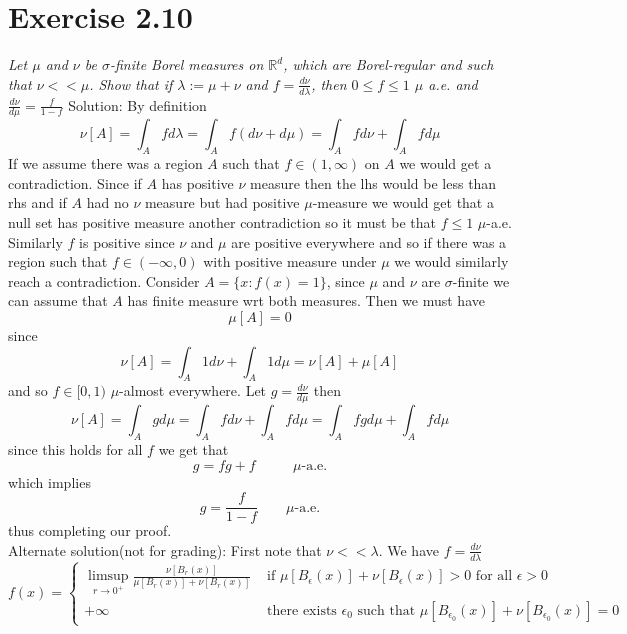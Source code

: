 \documentclass[11pt]{article}
\newcommand{\solution}[1]{{{\textcolor{header}{Solution:} \textcolor{solution}{#1}}}}
\begin{document}
\section{Exercise 2.10}
\emph{
    Let $\mu$ and $\nu$ be  $\sigma$-finite Borel measures on $ \mathbb{R}^{d}$, which are Borel-regular and such that $\nu << \mu$. Show that
    if $\lambda := \mu + \nu$ and $f = \frac{d\nu}{d \lambda}$, then $0 \le f \le 1$  $\mu$ a.e. and $\frac{d \nu}{d  \mu} = \frac{f}{1-f}$
}
\solution{
    By definition
    \[
        \nu[A] = \int_{A}^{}f d \lambda = \int_{A}^{}f(d \nu + d \mu) = \int_{A}^{}f d \nu + \int_{A}^{}f d \mu
    \] 
    If we assume there was a region $A$ such that  $f \in (1,\infty)$ on $A$ we would get a contradiction.
    Since if $A$ has positive  $\nu$ measure then the lhs would be less than rhs and if  $A$ had no  $\nu$ measure but had positive  $\mu$-measure we would 
    get that a null set has positive measure another contradiction so it must be that $f \le 1$  $\mu$-a.e.
    Similarly  $f$ is positive since $\nu$ and  $\mu$ are positive everywhere and so if there was a region
    such that  $f \in (-\infty,0)$ with positive measure under $\mu$ we would similarly reach a contradiction.
    Consider $A = \{x : f(x) = 1\}$, since $\mu$ and $\nu$ are  $\sigma$-finite we can assume that $A$ has finite measure wrt both measures.
    Then we must have
     \[
         \mu[A] = 0
    \] 
    since 
    \[
        \nu[A] = \int_{A}^{}1 d \nu + \int_{A}^{}1 d \mu = \nu[A] + \mu[A]
    \] 
    and so $f \in [0,1)$  $\mu$-almost everywhere.
    Let $g = \frac{d \nu}{d \mu}$ 
    then
    \[
        \nu[A] = \int_{A}^{} g d \mu = \int_{A}^{} f d \nu + \int_{A}^{} f d \mu = \int_{A}^{}fg d \mu + \int_{A}^{}f d \mu
    \] 
    since this holds for all $f$ we get that
     \[
         g = fg + f \qquad \text{ $\mu$-a.e.}
    \] 
    which implies
    \[
        g = \frac{f}{1-f} \qquad \text{$\mu$-a.e.}
    \] 
    thus completing our proof.
    \\
    Alternate solution(not for grading):
    First note that $\nu << \lambda$.
    We have $f = \frac{d \nu}{ d \lambda}$
    \[
        f(x) = 
        \begin{cases}
            \limsup_{r\to 0^{+}} \frac{\nu[B_r(x)]}{\mu[B_r(x)] + \nu[B_r(x)]} & \text{ if $\mu[B_\epsilon(x)] + \nu[B_\epsilon(x)] > 0$ for all $\epsilon > 0$}\\
            +\infty & \text{ there exists $\epsilon_0$ such that $\mu[B_{\epsilon_0}(x)] + \nu[B_{\epsilon_0}(x)] =0$ }
        \end{cases}
\]}
\end{document}
